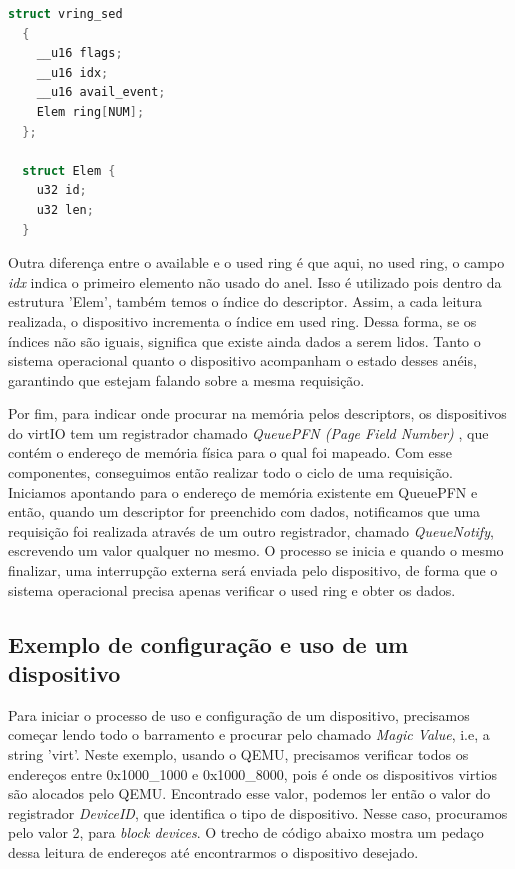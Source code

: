 \begin{lstlisting}[language=C]
  struct vring_sed
  {
    __u16 flags;
    __u16 idx;
    __u16 avail_event;
    Elem ring[NUM];
  };

  struct Elem {
    u32 id;
    u32 len;
  }
\end{lstlisting}


Outra diferença entre o available e o used ring é que aqui, no used ring, o campo \emph{idx} indica o primeiro elemento não usado do anel.
Isso é utilizado pois dentro da estrutura 'Elem', também temos o índice do descriptor. Assim, a cada leitura realizada, o dispositivo incrementa o índice em used ring.
Dessa forma, se os índices não são iguais, significa que existe ainda dados a serem lidos. 	Tanto o sistema operacional quanto o dispositivo acompanham o estado desses anéis, garantindo que estejam falando sobre a mesma requisição.


Por fim, para indicar onde procurar na memória pelos descriptors, os dispositivos do virtIO tem um registrador chamado \emph{QueuePFN (Page Field Number)} , que contém o endereço de memória física para o qual foi mapeado. Com esse componentes, conseguimos então realizar todo o ciclo de uma requisição. Iniciamos apontando para o endereço de memória existente em QueuePFN e então, quando um descriptor for preenchido com dados, notificamos que uma requisição foi realizada através de um outro registrador, chamado \emph{QueueNotify}, escrevendo um valor qualquer no mesmo. O processo se inicia e quando o mesmo finalizar, uma interrupção externa será enviada pelo dispositivo, de forma que o sistema operacional precisa apenas verificar o used ring e obter os dados.


\subsection*{Exemplo de configuração e uso de um dispositivo}

Para iniciar o processo de uso e configuração de um dispositivo, precisamos começar lendo todo o barramento e procurar pelo chamado \emph{Magic Value}, i.e, a string 'virt'.
Neste exemplo, usando o QEMU, precisamos verificar todos os endereços entre 0x1000{\_}1000 e 0x1000{\_}8000, pois é onde os dispositivos virtios são alocados pelo QEMU.
Encontrado esse valor, podemos ler então o valor do registrador \emph{DeviceID}, que identifica o tipo de dispositivo. Nesse caso, procuramos pelo valor 2, para \emph{block devices}.
O trecho de código abaixo mostra um pedaço dessa leitura de endereços até encontrarmos o dispositivo desejado.

